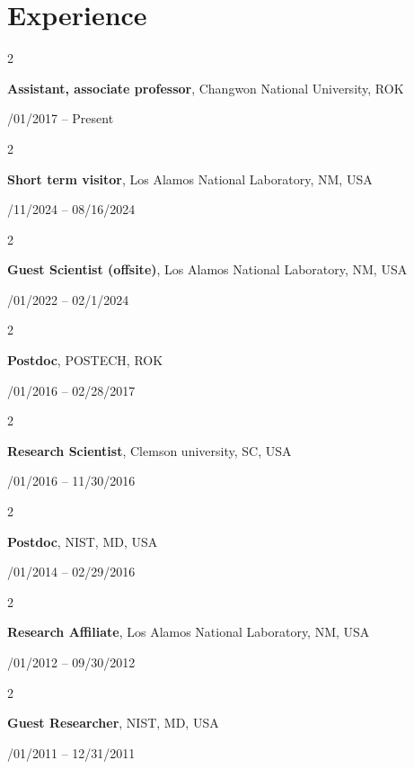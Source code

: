 \documentclass[10pt, letterpaper]{article}
\newenvironment{twocolentry}[2][]{
    \onecolentry
    \def\secondColumn{#2}
    \setcolumnwidth{\fill, 4.5 cm}
    \begin{paracol}{2}
}{
    \switchcolumn \raggedleft \secondColumn
    \end{paracol}
    \endonecolentry
} %
\begin{document}
    \section{Experience}
        \begin{twocolentry}{03/01/2017 – Present}
            \textbf{Assistant, associate professor}, Changwon National University, ROK
        \end{twocolentry}
        \vspace{0.10 cm}
        \begin{twocolentry}{07/11/2024 – 08/16/2024}
            \textbf{Short term visitor}, Los Alamos National Laboratory, NM, USA
        \end{twocolentry}
        \vspace{0.10 cm}
        \begin{twocolentry}{02/01/2022 – 02/1/2024}
            \textbf{Guest Scientist (offsite)}, Los Alamos National Laboratory, NM, USA
        \end{twocolentry}
        \vspace{0.10 cm}
        \begin{twocolentry}{12/01/2016 – 02/28/2017}
            \textbf{Postdoc}, POSTECH, ROK
        \end{twocolentry}
        \vspace{0.10 cm}
        \begin{twocolentry}{03/01/2016 – 11/30/2016}
            \textbf{Research Scientist}, Clemson university, SC, USA
        \end{twocolentry}
        \vspace{0.10 cm}
        \begin{twocolentry}{03/01/2014 – 02/29/2016}
            \textbf{Postdoc}, NIST, MD, USA
        \end{twocolentry}
        \vspace{0.10 cm}
        \begin{twocolentry}{04/01/2012 – 09/30/2012}
            \textbf{Research Affiliate}, Los Alamos National Laboratory, NM, USA
        \end{twocolentry}
        \vspace{0.10 cm}
        \begin{twocolentry}{06/01/2011 – 12/31/2011}
            \textbf{Guest Researcher}, NIST, MD, USA
        \end{twocolentry}
        \vspace{0.10 cm}

\end{document}
